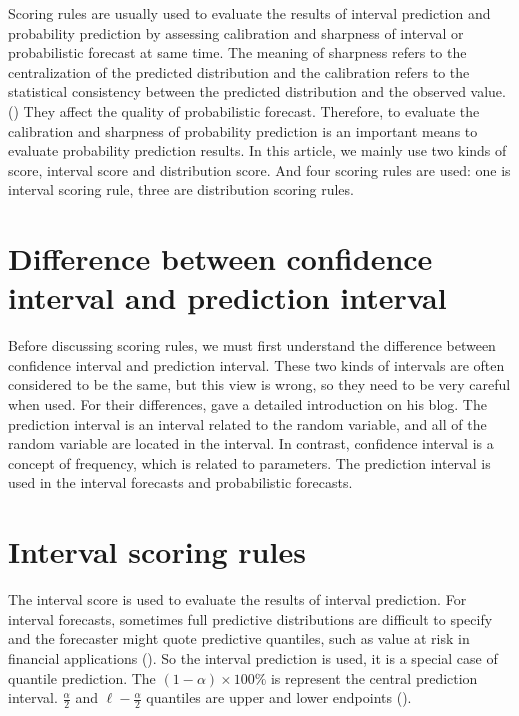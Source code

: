 \documentclass{monashthesis}
\theoremstyle{definition}
\theoremstyle{definition}
\theoremstyle{definition}
\theoremstyle{remark}
\begin{document}
Scoring rules are usually used to evaluate the results of interval
prediction and probability prediction by assessing calibration and
sharpness of interval or probabilistic forecast at same time. The
meaning of sharpness refers to the centralization of the predicted
distribution and the calibration refers to the statistical consistency
between the predicted distribution and the observed value.
(\textcite{GBR07}) They affect the quality of probabilistic forecast.
Therefore, to evaluate the calibration and sharpness of probability
prediction is an important means to evaluate probability prediction
results. In this article, we mainly use two kinds of score, interval
score and distribution score. And four scoring rules are used: one is
interval scoring rule, three are distribution scoring rules.

\section{Difference between confidence interval and prediction
interval}\label{difference-between-confidence-interval-and-prediction-interval}

Before discussing scoring rules, we must first understand the difference
between confidence interval and prediction interval. These two kinds of
intervals are often considered to be the same, but this view is wrong,
so they need to be very careful when used. For their differences,
\textcite{RH13} gave a detailed introduction on his blog. The prediction
interval is an interval related to the random variable, and all of the
random variable are located in the interval. In contrast, confidence
interval is a concept of frequency, which is related to parameters. The
prediction interval is used in the interval forecasts and probabilistic
forecasts.

\section{Interval scoring rules}\label{interval-scoring-rules}

The interval score is used to evaluate the results of interval
prediction. For interval forecasts, sometimes full predictive
distributions are difficult to specify and the forecaster might quote
predictive quantiles, such as value at risk in financial applications
(\textcite{GR07}). So the interval prediction is used, it is a special
case of quantile prediction. The \((1-\alpha)\times100\%\) is represent
the central prediction interval. \(\frac{\alpha}{2}\) and
\(\ell-\frac{\alpha}{2}\) quantiles are upper and lower endpoints
(\textcite{GBR07}).
\end{document}
